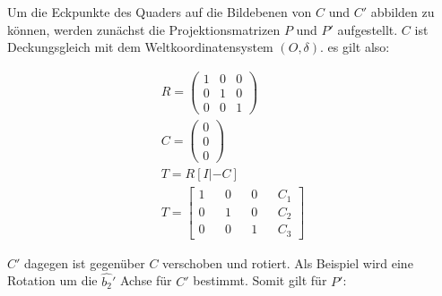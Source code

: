 
%
Um die Eckpunkte des Quaders auf die Bildebenen von $C$ und $C'$ abbilden zu können, werden zunächst die Projektionsmatrizen $P$ und $P'$ aufgestellt. $C$ ist Deckungsgleich mit dem Weltkoordinatensystem $(O,\delta)$. es gilt also:

\begin{gather}
R=\begin{pmatrix}
1&0&0\\
0&1&0\\
0&0&1
\end{pmatrix}\\
C=\begin{pmatrix}
0\\0\\0
\end{pmatrix}\\
T = R[I|-C]\\
T = \begin{bmatrix}
1&&0&&0&&C_1\\
0&&1&&0&&C_2\\
0&&0&&1&&C_3
\end{bmatrix}
\end{gather} 

$C'$ dagegen ist gegenüber $C$ verschoben und rotiert. Als Beispiel wird eine Rotation um die $\hat{b_2}'$ Achse für $C'$ bestimmt. Somit gilt für $P'$:






